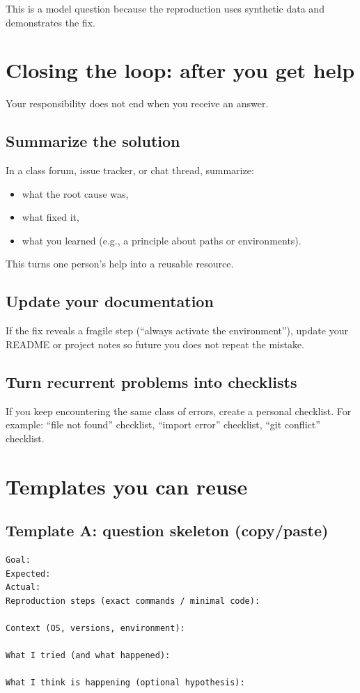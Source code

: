 This is a model question because the reproduction uses synthetic data and demonstrates the fix.

\section{Closing the loop: after you get help}
Your responsibility does not end when you receive an answer.

\subsection{Summarize the solution}
In a class forum, issue tracker, or chat thread, summarize:
\begin{itemize}[noitemsep]
  \item what the root cause was,
  \item what fixed it,
  \item what you learned (e.g., a principle about paths or environments).
\end{itemize}

This turns one person's help into a reusable resource.

\subsection{Update your documentation}
If the fix reveals a fragile step (``always activate the environment''), update your README or project notes so future you does not repeat the mistake.

\subsection{Turn recurrent problems into checklists}
If you keep encountering the same class of errors, create a personal checklist. For example: ``file not found'' checklist, ``import error'' checklist, ``git conflict'' checklist.

\section{Templates you can reuse}
\subsection{Template A: question skeleton (copy/paste)}
\begin{verbatim}
Goal:
Expected:
Actual:
Reproduction steps (exact commands / minimal code):

Context (OS, versions, environment):

What I tried (and what happened):

What I think is happening (optional hypothesis):
\end{verbatim}


